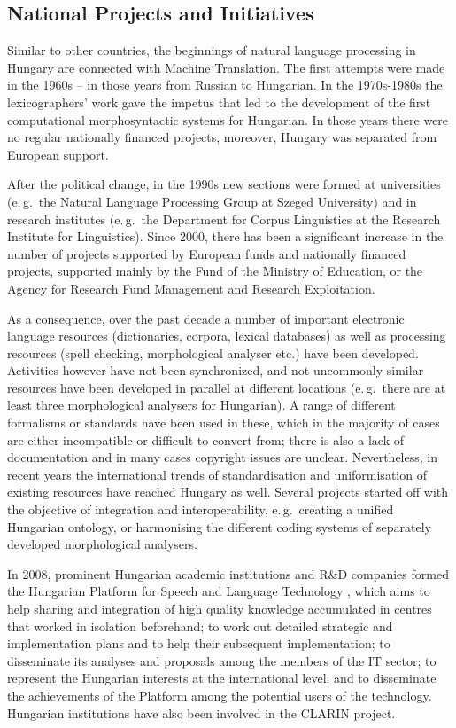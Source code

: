 \begin{multicols}{2}
\subsection{National Projects and Initiatives}

Similar to other countries, the beginnings of natural language processing in Hungary are connected with Machine Translation. The first attempts were made in the 1960s -- in those years from Russian to Hungarian. In the 1970s-1980s the lexicographers' work gave the impetus that led to the development of the first computational morphosyntactic systems for Hungarian. In those years there were no regular nationally financed projects, moreover, Hungary was separated from European support.

    After the political change, in the 1990s new sections were formed at universities (e.\,g.~the Natural Language Processing Group at Szeged University) and in research institutes (e.\,g.~the Department for Corpus Linguistics at the Research Institute for Linguistics). Since 2000, there has been a significant increase in the number of projects supported by European funds and nationally financed projects, supported mainly by the Fund of the Ministry of Education, or the Agency for Research Fund Management and Research Exploitation. 

    As a consequence, over the past decade a number of important electronic language resources (dictionaries, corpora, lexical databases) as well as processing resources (spell checking, morphological analyser etc.) have been developed. Activities however have not been synchronized, and not uncommonly similar resources have been developed in parallel at different locations (e.\,g.~there are at least three morphological analysers for Hungarian). A range of different formalisms or standards have been used in these, which in the majority of cases are either incompatible or difficult to convert from; there is also a lack of documentation and in many cases copyright issues are unclear. Nevertheless, in recent years the international trends of standardisation and uniformisation of existing resources have reached Hungary as well. Several projects started off with the objective of integration and interoperability, e.\,g.~creating a unified Hungarian ontology, or harmonising the different coding systems of separately developed morphological analysers.

    In 2008, prominent Hungarian academic institutions and R\&D companies formed the Hungarian Platform for Speech and Language Technology \cite{platform}, which aims to help sharing and integration of high quality knowledge accumulated in centres that worked in isolation beforehand; to work out detailed strategic and implementation plans and to help their subsequent implementation; to disseminate its analyses and proposals among the members of the IT sector; to represent the Hungarian interests at the international level; and to disseminate the achievements of the Platform among the potential users of the technology. Hungarian institutions have also been involved in the CLARIN project. 


\end{multicols}
